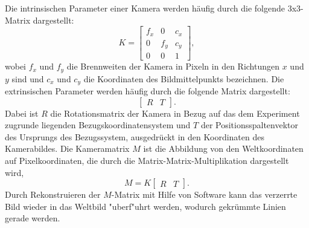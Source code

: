 \documentclass[arbeit=studie,oneside,BCOR=12mm]{ArbeitRST}
\begin{document}
Die intrinsischen Parameter
einer Kamera werden häufig durch die folgende 3x3-Matrix dargestellt:
\begin{equation} 
    K = 
    \begin{bmatrix} 
        f_x & 0 & c_x\\ 
        0 & f_y & c_y\\ 
        0 & 0 & 1
    \end{bmatrix}, 
\end{equation} 
wobei $f_x$ und $f_y$ die Brennweiten der Kamera in Pixeln in den
Richtungen $x$ und $y$ sind und $c_x$ und $c_y$ die Koordinaten des Bildmittelpunkts
bezeichnen. Die extrinsischen Parameter werden häufig durch die folgende Matrix
dargestellt: 
\begin{equation}
    \begin{bmatrix} R & T \end{bmatrix}. 
\end{equation} 
Dabei ist $R$ die Rotationsmatrix der Kamera in Bezug auf das dem Experiment zugrunde 
liegenden Bezugskoordinatensystem und $T$
der Positionsspaltenvektor des Ursprungs des Bezugssystem, ausgedrückt in den
Koordinaten des Kamerabildes. Die Kameramatrix $M$ ist die Abbildung von
den Weltkoordinaten auf Pixelkoordinaten, die durch die
Matrix-Matrix-Multiplikation dargestellt wird, 
\begin{equation} 
    M = K 
    \begin{bmatrix} 
        R & T
    \end{bmatrix}. 
\end{equation} 
Durch Rekonstruieren der $M$-Matrix mit Hilfe von Software \cite{opencv} kann das verzerrte
Bild wieder in das Weltbild "uberf"uhrt werden, wodurch gekrümmte Linien gerade
werden. \\
\end{document}
